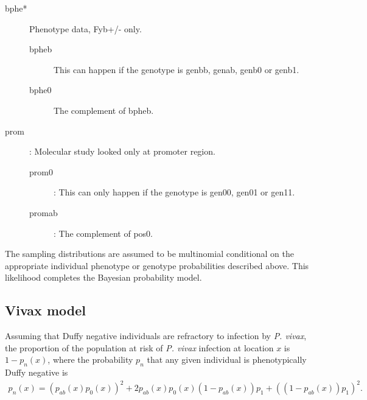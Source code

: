\begin{description}
\begin{description}
    \end{description}
    \item[bphe*] Phenotype data, Fyb+/- only.
    \begin{description}
        \item[bpheb] This can happen if the genotype is genbb, genab, genb0 or genb1.
        \item[bphe0] The complement of bpheb. 
    \end{description}
    \item[prom]: Molecular study looked only at promoter region.
    \begin{description}
        \item[prom0]: This can only happen if the genotype is gen00, gen01 or gen11.
        \item[promab]: The complement of pos0.
    \end{description}
\end{description}

The sampling distributions are assumed to be multinomial conditional on the appropriate individual phenotype or genotype probabilities described above. This likelihood completes the Bayesian probability model.

\subsection*{Vivax model} 
Assuming that Duffy negative individuals are refractory to infection by \emph{P. vivax}, the proportion of the population at risk of \emph{P. vivax} infection at location $x$ is $1-p_n(x)$, where the probability $p_n$ that any given individual is phenotypically Duffy negative is 
\begin{eqnarray*}
    p_n(x)=\left(p_{ab}(x)p_0(x)\right)^2+2p_{ab}(x)p_0(x)(1-p_{ab}(x))p_1+\left((1-p_{ab}(x))p_1\right)^2.
\end{eqnarray*}

